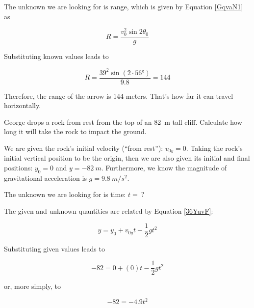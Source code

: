 \documentclass{article}
\begin{document}
\vspace{1em}

The unknown we are looking for is range, which is given by Equation \eqref{GqvaN1} as

\begin{equation*}
    R = \frac{v_0^2 \sin{2\theta_0}}{g}
\end{equation*}

Substituting known values leads to

\begin{equation*}
    R = \frac{39^2 \sin{(2 \cdot \ang{56})}}{9.8} = 144
\end{equation*}

Therefore, the range of the arrow is 144 meters. That's how far it can travel horizontally.

\endsolution

\begin{example} \label{9XXF9X}
    George drops a rock from rest from the top of an \SI{82}{m} tall cliff. Calculate how long it will take the rock to impact the ground. 
\end{example}

\Solution We are given the rock's initial velocity (``from rest''): $v_{0y} = 0$. Taking the rock's initial vertical position to be the origin, then we are also given its initial and final positions: $y_0 = 0$ and $y = \SI{-82}{m}$. Furthermore, we know the magnitude of gravitational acceleration is $g = \SI{9.8}{m/s^2}$. 

\vspace{1em}

The unknown we are looking for is time: $t =\ ?$

\vspace{1em}

The given and unknown quantities are related by Equation \eqref{36YuvF}:

\begin{equation*}
    y = y_0 + v_{0y}t - \frac{1}{2}  g t^2
\end{equation*}

Substituting given values leads to 

\begin{equation*}
    -82 = 0 + (0) t - \frac{1}{2} g t^2
\end{equation*}

or, more simply, to

\begin{equation*}
    -82 = - 4.9 t^2
\end{equation*}
\end{document}
